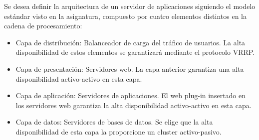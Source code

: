 \TheSolution


\Problem[11]
Se desea definir la arquitectura de un servidor de aplicaciones
 siguiendo el modelo estándar visto en la asignatura, compuesto por
cuatro elementos distintos en la cadena de procesamiento:
\begin{itemize}
	\item Capa de distribución: Balanceador de carga del tráfico de usuarios.
La alta disponibilidad de estos elementos se garantizará mediante el
protocolo VRRP.
	\item Capa de presentación: Servidores web. La capa anterior garantiza una alta disponibilidad activo-activo en esta capa.
	\item Capa de aplicación: Servidores de aplicaciones. El web plug-in
insertado en los servidores web garantiza la alta disponibilidad
activo-activo en esta capa.
	\item Capa de datos: Servidores de bases de datos. Se elige que la
alta disponibilidad de esta capa la proporcione un cluster
activo-pasivo.

\end{itemize}

